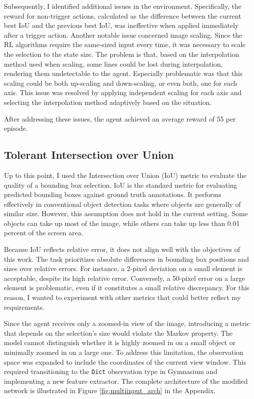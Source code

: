 \documentclass[
  digital,     %
  oneside,     %
  nosansbold,  %
  nocolorbold, %
  lof,         %
  lot,         %
]{fithesis4}
\begin{document}
Subsequently, I identified additional issues in the environment. Specifically, the reward for non-trigger actions, calculated as the difference between the current best IoU and the previous best IoU, was ineffective when applied immediately after a trigger action.
Another notable issue concerned image scaling. Since the RL algorithms require the same-sized input every time, it was necessary to scale the selection to the state size. The problem is that, based on the interpolation method used when scaling, some lines could be lost during interpolation, rendering them undetectable to the agent. Especially problematic was that this scaling could be both up-scaling and down-scaling, or even both, one for each axis. This issue was resolved by applying independent scaling for each axis and selecting the interpolation method adaptively based on the situation.

After addressing these issues, the agent achieved an average reward of 55 per episode.

\subsection{Tolerant Intersection over Union}
\label{subsec:eval_metric}

Up to this point, I used the Intersection over Union (IoU) metric to evaluate the quality of a bounding box selection. IoU is the standard metric for evaluating predicted bounding boxes against ground truth annotations. It performs effectively in conventional object detection tasks where objects are generally of similar size. However, this assumption does not hold in the current setting. Some objects can take up most of the image, while others can take up less than 0.01 percent of the screen area.

Because IoU reflects relative error, it does not align well with the objectives of this work. The task prioritizes absolute differences in bounding box positions and sizes over relative errors. For instance, a 2-pixel deviation on a small element is acceptable, despite its high relative error. Conversely, a 50-pixel error on a large element is problematic, even if it constitutes a small relative discrepancy. For this reason, I wanted to experiment with other metrics that could better reflect my requirements.

Since the agent receives only a zoomed-in view of the image, introducing a metric that depends on the selection’s size would violate the Markov property. The model cannot distinguish whether it is highly zoomed in on a small object or minimally zoomed in on a large one. To address this limitation, the observation space was expanded to include the coordinates of the current view window. This required transitioning to the \texttt{Dict} observation type in Gymnasium and implementing a new feature extractor. The complete architecture of the modified network is illustrated in Figure \ref{fig:multiinput_arch} in the Appendix.
\end{document}

